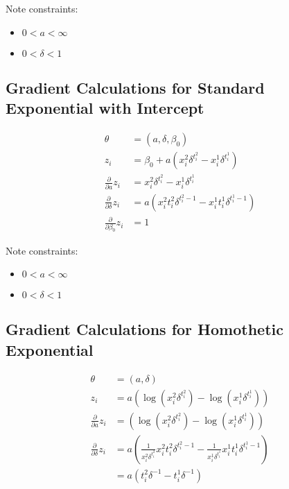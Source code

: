 \documentclass[12pt]{article}
\begin{document}
Note constraints:

\begin{itemize}
    \item{$0 < a < \infty$}
    \item{$0 < \delta < 1$}
\end{itemize}

\subsection{Gradient Calculations for Standard Exponential with Intercept}

\begin{align*}
  \theta &= (a, \delta, \beta_0) \\
  z_i &= \beta_0 + a (x^2_i \delta^{t^2_i} - x^1_i \delta^{t^1_i}) \\
  \frac{\partial}{\partial a} z_i
    &= x^2_i \delta^{t^2_i} - x^1_i \delta^{t^1_i} \\
  \frac{\partial}{\partial \delta} z_i
    &= a (x^2_i t^2_i \delta^{t^2_i - 1} - x^1_i t^1_i \delta^{t^1_i - 1}) \\
  \frac{\partial}{\partial \beta_0} z_i
    &= 1
\end{align*}

Note constraints:

\begin{itemize}
    \item{$0 < a < \infty$}
    \item{$0 < \delta < 1$}
\end{itemize}

\subsection{Gradient Calculations for Homothetic Exponential}

\begin{align*}
\theta &= (a, \delta) \\
z_i &= a (\log(x^2_i \delta^{t^2_i}) - \log(x^1_i \delta^{t^1_i})) \\
\frac{\partial}{\partial a} z_i
  &= (\log(x^2_i \delta^{t^2_i}) - \log(x^1_i \delta^{t^1_i})) \\
\frac{\partial}{\partial \delta} z_i
  &= a (
      \frac{1}{x^2_i \delta^{t^2_i}} x^2_i t^2_i  \delta^{t^2_i - 1} -
      \frac{1}{x^1_i \delta^{t^1_i}} x^1_i t^1_i \delta^{t^1_i - 1}
    ) \\
  &= a (t^2_i \delta^{-1} - t^1_i \delta^{-1}) \\
\end{align*}
\end{document}
